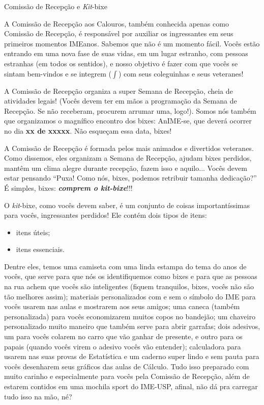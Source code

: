 \begin{secao}{Comissão de Recepção e \textit{Kit}-bixe}

A Comissão de Recepção aos Calouros, também conhecida apenas como Comissão de 
Recepção, é responsável por auxiliar os ingressantes em seus primeiros momentos 
IMEanos. Sabemos que não é um momento fácil. Vocês estão entrando em uma nova fase 
de suas vidas, em um lugar estranho, com pessoas estranhas (em todos os sentidos),
e nosso objetivo é fazer com que vocês se sintam bem-vindos e se integrem
($\int$) com seus coleguinhas e seus veteranes!

A Comissão de Recepção organiza a super Semana de Recepção, cheia de atividades
legais! (Vocês devem ter em mãos a programação da Semana de Recepção. 
Se não receberam, procurem arrumar uma, logo!).
Somos nós também que organizamos o magnífico encontro dos bixes: AnIME-se, que 
deverá ocorrer no dia \textbf{xx de xxxxx}. Não esqueçam essa data, bixes! %

A Comissão de Recepção é formada pelos mais animados e divertidos veteranes. Como
dissemos, eles organizam a Semana de Recepção, ajudam bixes perdidos, mantêm um clima
alegre durante recepção, fazem isso e aquilo...
Vocês devem estar pensando ``Puxa! Como nós, bixes, podemos retribuir
tamanha dedicação?'' É simples, bixes: {\bf\em comprem o \textit{kit}-bixe}!!!

O \textit{kit}-bixe, como vocês devem saber, é um conjunto de coisas
importantíssimas para vocês, ingressantes perdidos! Ele contém dois tipos de
itens:
\begin{itemize}
\item itens úteis;
\item itens essenciais.
\end{itemize} %
Dentre eles, temos uma camiseta com uma linda estampa do tema do anos de vocês,
que serve para que nós os identifiquemos como bixes e para que as pessoas na 
rua achem que vocês são inteligentes (fiquem tranquilos, bixes, vocês não são 
tão melhores assim); materiais personalizados com e sem o símbolo do IME para 
vocês usarem nas aulas e mostrarem aos seus amigos; uma caneca (também personalizada) 
para vocês economizarem muitos copos no bandejão; um chaveiro personalizado muito 
maneiro que também serve para abrir garrafas;
dois adesivos, um para vocês colarem no carro que vão ganhar de presente, e outro
para os papais (quando vocês virem o adesivo vocês vão entender); calculadora para 
usarem nas suas provas de Estatística e um caderno super
lindo e sem pauta para vocês desenharem seus gráficos das aulas de Cálculo. Tudo
isso preparado com muito carinho e especialmente para vocês pela Comissão de Recepção,
além de estarem contidos em uma mochila sport do IME-USP, afinal, não dá pra
carregar tudo isso na mão, né?


\end{secao}
